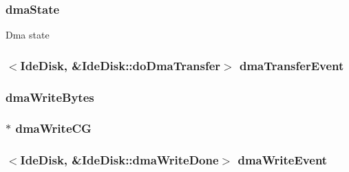 \label{classIdeDisk_a163b3ebdf005a99628b313b535697fb4}
\hypertarget{classIdeDisk_acdefad9ebc91ac85f00ff92347b944d7}{
\subsubsection[{dmaState}]{ {\bf dmaState}}}
\label{classIdeDisk_acdefad9ebc91ac85f00ff92347b944d7}
Dma state \hypertarget{classIdeDisk_aa90327d610dcc75173d1cd63671c6d31}{
\subsubsection[{dmaTransferEvent}]{$<${\bf IdeDisk}, \&IdeDisk::doDmaTransfer$>$ {\bf dmaTransferEvent}}}
\label{classIdeDisk_aa90327d610dcc75173d1cd63671c6d31}
\hypertarget{classIdeDisk_a59676f0552c89ab5f75ed2e6d8fca378}{
\subsubsection[{dmaWriteBytes}]{ {\bf dmaWriteBytes}}}
\label{classIdeDisk_a59676f0552c89ab5f75ed2e6d8fca378}
\hypertarget{classIdeDisk_a9efaedbad52401a1b8ac2b8f1dffd28e}{
\subsubsection[{dmaWriteCG}]{$\ast$ {\bf dmaWriteCG}}}
\label{classIdeDisk_a9efaedbad52401a1b8ac2b8f1dffd28e}
\hypertarget{classIdeDisk_a6c721e441022d80574b109229351326a}{
\subsubsection[{dmaWriteEvent}]{$<${\bf IdeDisk}, \&IdeDisk::dmaWriteDone$>$ {\bf dmaWriteEvent}}}
